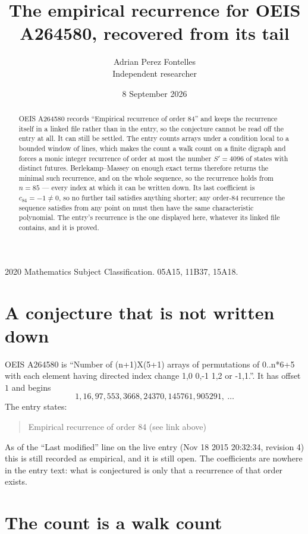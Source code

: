 \documentclass[11pt,a4paper]{article}
\title{The empirical recurrence for OEIS A264580, recovered from its tail}
\author{Adrian Perez Fontelles\\ \small Independent researcher}
\date{8 September 2026}
\theoremstyle{plain}
\theoremstyle{definition}
\begin{document}
\maketitle

\begin{abstract}
OEIS A264580 records ``Empirical recurrence of order $84$'' and keeps the recurrence itself in
a linked file rather than in the entry, so the conjecture cannot be read off the entry at all.
It can still be settled. The entry counts arrays under a condition local to a bounded window of
lines, which makes the count a walk count on a finite digraph and forces a monic integer
recurrence of order at most the number $S'=4096$ of states with distinct futures. Berlekamp--Massey on
enough exact terms therefore returns the minimal such recurrence, and on the whole sequence, so the recurrence holds from $n=85$ --- every index at which it can be written down.
Its last coefficient is $c_{84}=-1\neq0$, so no further tail satisfies anything
shorter; any order-$84$ recurrence the sequence satisfies from any point on must then have
the same characteristic polynomial. The entry's recurrence is the one displayed here, whatever
its linked file contains, and it is proved.
\end{abstract}

\noindent\small 2020 Mathematics Subject Classification. 05A15, 11B37, 15A18.\normalsize

\section{A conjecture that is not written down}

OEIS A264580 is ``Number of (n+1)X(5+1) arrays of permutations of 0..n*6+5 with each element having directed index change 1,0 0,-1 1,2 or -1,1.''. It has offset $1$ and begins
\[
1, 16, 97, 553, 3668, 24370, 145761, 905291,\ \dots
\]
The entry states:
\begin{quote}
Empirical recurrence of order 84 (see link above)
\end{quote}
As of the ``Last modified'' line on the live entry (Nov 18 2015 20:32:34, revision 4)
this is still recorded as empirical, and it is still open. The coefficients are nowhere in the
entry text: what is conjectured is only that a recurrence of that order exists.

\section{The count is a walk count}
\end{document}
